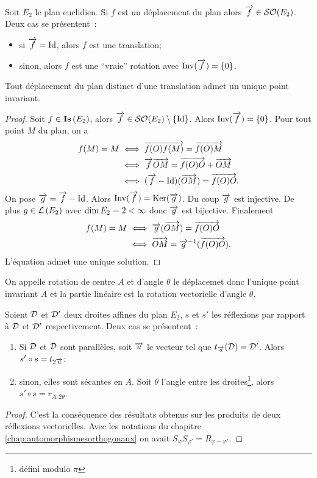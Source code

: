 Soit $E_2$ le plan euclidien. Si $f$ est un déplacement du plan alors $\overrightarrow{f} \in \mathcal{SO}\!\left(E_2\right)$. Deux cas se présentent~:
\begin{itemize}
\item si $\overrightarrow{f} = \operatorname{Id}$, alors $f$ est une translation;
\item sinon, alors $f$ est une ``vraie'' rotation avec $\operatorname{Inv}(\overrightarrow{f})=\{0\}$.
\end{itemize}
%
\begin{theo}
 Tout déplacement du plan distinct d'une translation admet un unique point invariant. 
\end{theo}
\begin{proof}
  Soit $f \in \mathbf{Is}\left(E_2\right)$, alors $\overrightarrow{f}\in \mathcal{SO}\!\left(E_2\right)\setminus\{\operatorname{Id}\}$. Alors $\operatorname{Inv}(\overrightarrow{f})=\{0\}$. Pour tout point $M$ du plan, on a
  \begin{align}
    f(M)=M &\iff \overrightarrow{f(O)f(M)} = \overrightarrow{f(O)M} \\
    &\iff \overrightarrow{f}{\overrightarrow{OM}} = \overrightarrow{f(O)O} + \overrightarrow{OM} \\
    &\iff (\overrightarrow{f}-\operatorname{Id})(\overrightarrow{OM}) = \overrightarrow{f(O)O}.
  \end{align}
  On pose $\overrightarrow{g}=\overrightarrow{f}-\operatorname{Id}$. Alors $\operatorname{Inv}(\overrightarrow{f})=\operatorname{Ker}(\overrightarrow{g})$. Du coup $\overrightarrow{g}$ est injective. De plus $g \in \mathcal{L}\left(E_2\right)$ avec $\operatorname{dim} E_2=2 <\infty$ donc $\overrightarrow{g}$ est bijective. Finalement
  \begin{align}
    f(M)=M &\iff \overrightarrow{g}(\overrightarrow{OM}) = \overrightarrow{f(O)O} \\
    &\iff \overrightarrow{OM} = \overrightarrow{g}^{-1}(\overrightarrow{f(O)O}).
  \end{align}
  L'équation admet une unique solution.
\end{proof}
\begin{defdef}
  On appelle rotation de centre $A$ et d'angle $\theta$ le déplacemet donc l'unique point invariant $A$ et la partie linéaire est la rotation vectorielle d'angle $\theta$.
\end{defdef}
%
\begin{prop}
  Soient $\mathcal{D}$ et $\mathcal{D}'$ deux droites affines du plan $E_2$, $s$ et $s'$ les réflexions par rapport à $\mathcal{D}$ et $\mathcal{D}'$ respectivement. Deux cas se présentent~:
  \begin{enumerate}
  \item Si $\mathcal{D}$ et $\mathcal{D}$ sont parallèles, soit $\overrightarrow{u}$ le vecteur tel que $t_{\overrightarrow{u}}(\mathcal{D})=\mathcal{D}'$. Alors $s'\circ s=t_{2\overrightarrow{u}}$;
  \item sinon, elles sont sécantes en $A$. Soit $\theta$ l'angle entre les droites\footnote{défini modulo $\pi$}, alors $s'\circ s=r_{A, 2\theta}$.
  \end{enumerate}
\end{prop}
\begin{proof}
  C'est la conséquence des résultats obtenus sur les produits de deux réflexions vectorielles. Avec les notations du chapitre \ref{chap:automorphismesorthogonaux} on avait $S_\varphi S_{\varphi'}=R_{\varphi-\varphi'}$.
\end{proof}

